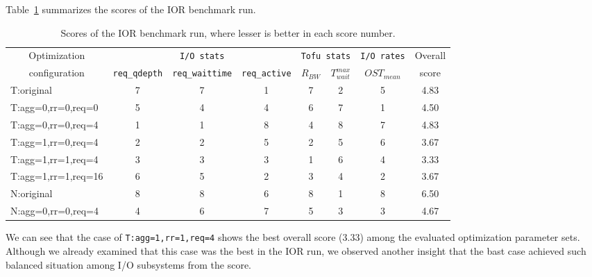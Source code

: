 \documentclass{jhps}
\begin{document}
Table~\ref{tbl:IOR_OVERALL_EVAL} summarizes the scores of the IOR benchmark run.
%
\begin{table}[tb]
\caption{Scores of the IOR benchmark run, where lesser is better in each score number.}
\centering
\begin{tabular}{lccccccc}
\hline
\multicolumn{1}{c}{Optimization}  & \multicolumn{3}{c}{{\tt I/O stats}} & \multicolumn{2}{c}{{\tt Tofu stats}} & {\tt I/O rates} & Overall \\
\multicolumn{1}{c}{configuration} & {\tt req\_qdepth} & {\tt req\_waittime} & {\tt req\_active} &  $R_{BW}$ & $T_{wait}^{max}$ & $OST_{mean}$ & score \\
\hline
T:original          & 7 & 7 & 1 & 7 & 2 & 5 & 4.83 \\
T:agg=0,rr=0,req=0  & 5 & 4 & 4 & 6 & 7 & 1 & 4.50 \\
T:agg=0,rr=0,req=4  & 1 & 1 & 8 & 4 & 8 & 7 & 4.83 \\
T:agg=1,rr=0,req=4  & 2 & 2 & 5 & 2 & 5 & 6 & 3.67 \\
T:agg=1,rr=1,req=4  & 3 & 3 & 3 & 1 & 6 & 4 & 3.33 \\
T:agg=1,rr=1,req=16 & 6 & 5 & 2 & 3 & 4 & 2 & 3.67 \\
N:original          & 8 & 8 & 6 & 8 & 1 & 8 & 6.50 \\
N:agg=0,rr=0,req=4  & 4 & 6 & 7 & 5 & 3 & 3 & 4.67 \\
\hline
\end{tabular}
\label{tbl:IOR_OVERALL_EVAL}
\end{table}
%
We can see that the case of {\tt T:agg=1,rr=1,req=4} shows
the best overall score (3.33) among the evaluated optimization parameter sets.
Although we already examined that this case was the best in the IOR run,
we observed another insight that the bast case achieved such balanced situation
among I/O subsystems from the score.
\end{document}
